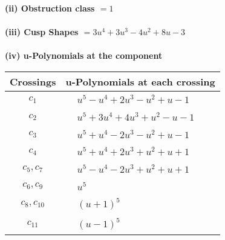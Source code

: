 \documentclass[1p]{elsarticle_modified}
\theoremstyle{definition}
\begin{document}
\flushleft \textbf{(ii) Obstruction class $= 1$}\\~\\
\flushleft \textbf{(iii) Cusp Shapes $= 3 u^4+3 u^3-4 u^2+8 u-3$}\\~\\
\newpage\renewcommand{\arraystretch}{1}
\flushleft \textbf{(iv) u-Polynomials at the component}\newline \\
\begin{tabular}{m{50pt}|m{274pt}}
Crossings & \hspace{64pt}u-Polynomials at each crossing \\
\hline $$\begin{aligned}c_{1}\end{aligned}$$&$\begin{aligned}
&u^5- u^4+2 u^3- u^2+u-1
\end{aligned}$\\
\hline $$\begin{aligned}c_{2}\end{aligned}$$&$\begin{aligned}
&u^5+3 u^4+4 u^3+u^2- u-1
\end{aligned}$\\
\hline $$\begin{aligned}c_{3}\end{aligned}$$&$\begin{aligned}
&u^5+u^4-2 u^3- u^2+u-1
\end{aligned}$\\
\hline $$\begin{aligned}c_{4}\end{aligned}$$&$\begin{aligned}
&u^5+u^4+2 u^3+u^2+u+1
\end{aligned}$\\
\hline $$\begin{aligned}c_{5},c_{7}\end{aligned}$$&$\begin{aligned}
&u^5- u^4-2 u^3+u^2+u+1
\end{aligned}$\\
\hline $$\begin{aligned}c_{6},c_{9}\end{aligned}$$&$\begin{aligned}
&u^5
\end{aligned}$\\
\hline $$\begin{aligned}c_{8},c_{10}\end{aligned}$$&$\begin{aligned}
&(u+1)^5
\end{aligned}$\\
\hline $$\begin{aligned}c_{11}\end{aligned}$$&$\begin{aligned}
&(u-1)^5
\end{aligned}$\\
\hline
\end{tabular}\\~\\
\end{document}
